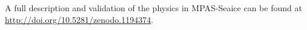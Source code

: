 A full description and validation of the physics in MPAS-Seaice can be found at \url{http://doi.org/10.5281/zenodo.1194374}.